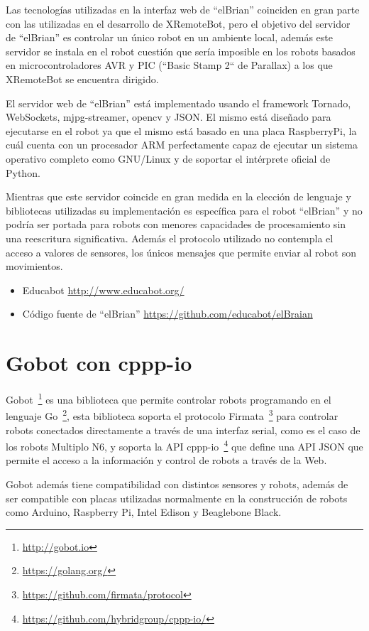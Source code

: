 Las tecnologías utilizadas en la interfaz web de ``elBrian'' coinciden en gran
parte con las utilizadas en el desarrollo de XRemoteBot, pero el objetivo del
servidor de ``elBrian'' es controlar un único robot en un ambiente local,
además este servidor
se instala en el robot cuestión que sería imposible en los robots basados en
microcontroladores AVR y PIC (``Basic Stamp 2`` de Parallax)
a los que XRemoteBot se encuentra dirigido.


El servidor web de ``elBrian'' está implementado usando el framework Tornado,
WebSockets, mjpg-streamer, opencv y JSON. El mismo está diseñado para ejecutarse
en el robot ya que el mismo está basado en una placa RaspberryPi, la cuál
cuenta con un procesador ARM perfectamente capaz de ejecutar un sistema
operativo completo como GNU/Linux y de soportar el intérprete oficial de Python.

Mientras que este servidor coincide en gran medida en la elección de lenguaje
y bibliotecas utilizadas su implementación es específica para el robot ``elBrian''
y no podría ser portada para robots con menores capacidades de procesamiento
sin una reescritura significativa. Además el protocolo utilizado no contempla
el acceso a valores de sensores, los únicos mensajes que permite enviar
al robot son movimientos.

\begin{itemize}
    \item Educabot \url{http://www.educabot.org/}
    \item Código fuente de ``elBrian'' \url{https://github.com/educabot/elBraian}
\end{itemize}

\section{Gobot con cppp-io}

Gobot~\footnote{\url{http://gobot.io}}
es una biblioteca que permite controlar robots programando en el lenguaje
Go~\footnote{\url{https://golang.org/}}, esta biblioteca soporta el
protocolo Firmata~\footnote{\url{https://github.com/firmata/protocol}}
para controlar robots
conectados directamente a través de una interfaz serial, como es el caso
de los robots Multiplo N6, y soporta la API
cppp-io~\footnote{\url{https://github.com/hybridgroup/cppp-io/}}
que define una API JSON
que permite el acceso a la información y control de robots a través de la Web.

Gobot además tiene compatibilidad con distintos sensores y robots, además de
ser compatible con
placas utilizadas normalmente en la construcción de robots como Arduino,
Raspberry Pi, Intel Edison y Beaglebone Black.

